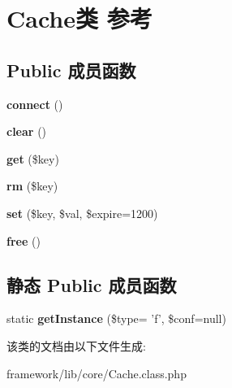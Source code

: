 \hypertarget{classCache}{\section{Cache类 参考}
\label{classCache}
}
\subsection*{Public 成员函数}
\begin{DoxyCompactItemize}
\item 
\hypertarget{classCache_a81f7747d3dd8a544d3cc20177483bfd2}{{\bfseries connect} ()}\label{classCache_a81f7747d3dd8a544d3cc20177483bfd2}

\item 
\hypertarget{classCache_a88748cfd9005e9dd8179c6774ea1378b}{{\bfseries clear} ()}\label{classCache_a88748cfd9005e9dd8179c6774ea1378b}

\item 
\hypertarget{classCache_ad25f006b5b60f18f23b3009ed18ce35b}{{\bfseries get} (\$key)}\label{classCache_ad25f006b5b60f18f23b3009ed18ce35b}

\item 
\hypertarget{classCache_a4bb2d39b510c73dce7a0740906226329}{{\bfseries rm} (\$key)}\label{classCache_a4bb2d39b510c73dce7a0740906226329}

\item 
\hypertarget{classCache_aca221ddf7cf4f4e26c0aa1ae38cd069f}{{\bfseries set} (\$key, \$val, \$expire=1200)}\label{classCache_aca221ddf7cf4f4e26c0aa1ae38cd069f}

\item 
\hypertarget{classCache_aebd1c49aa2b47c34f8af6b688a6922d4}{{\bfseries free} ()}\label{classCache_aebd1c49aa2b47c34f8af6b688a6922d4}

\end{DoxyCompactItemize}
\subsection*{静态 Public 成员函数}
\begin{DoxyCompactItemize}
\item 
\hypertarget{classCache_a1c8b6e18a6cf407216f4f7f7f3fefe7f}{static {\bfseries get\+Instance} (\$type= 'f', \$conf=null)}\label{classCache_a1c8b6e18a6cf407216f4f7f7f3fefe7f}

\end{DoxyCompactItemize}


该类的文档由以下文件生成\+:\begin{DoxyCompactItemize}
\item 
framework/lib/core/Cache.\+class.\+php\end{DoxyCompactItemize}
